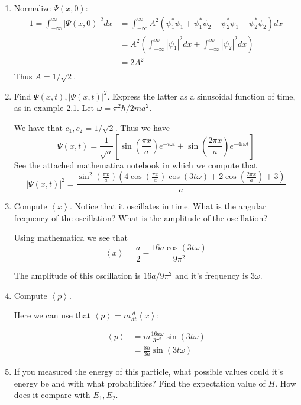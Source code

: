 \documentclass{article}
\newcommand{\bracket}[1]{\left[ #1 \right]}
\newcommand{\paren}[1]{\left( #1 \right)}
\newcommand{\braket}[1]{\left\langle #1 \right\rangle}
\newcommand{\intinf}{\int_{-\infty}^\infty}
\newenvironment{problem}{\begin{enumerate}[label=(\alph*)]}{\end{enumerate}}
\begin{document}
\begin{problem}
  \item Normalize $\Psi(x, 0)$:
    \begin{align*}
      1 = \intinf |\Psi(x, 0)|^2 dx &= \intinf A^2(\psi_1^* \psi_1 + \psi_1^*\psi_2 + \psi_2^* \psi_1 + \psi_2^* \psi_2)dx \\
                                    &= A^2 \paren{\intinf |\psi_1|^2 dx + \intinf |\psi_2|^2 dx} \\
                                    &= 2A^2 \\
    \end{align*}
    Thus $A = 1/\sqrt{2}$.
  \item Find $\Psi(x,t), |\Psi(x,t)|^2$. Express the latter as a sinusoidal function of time, as in example 2.1. Let $\omega = \pi^2\hbar / 2ma^2$.
      
    We have that $c_1, c_2 = 1/\sqrt{2}$. Thus we have
    $$\Psi(x, t) = \frac{1}{\sqrt{a}}\bracket{\sin\paren{\frac{\pi x}{a}}e^{-i\omega t} + \sin\paren{\frac{2 \pi x}{a}}e^{-4i\omega t}}$$
    See the attached mathematica notebook in which we compute that
    $$|\Psi(x, t)|^2 = \frac{\sin ^2\left(\frac{\pi  x}{a}\right) \left(4 \cos \left(\frac{\pi  x}{a}\right) \cos (3 t \omega)+2 \cos \left(\frac{2 \pi  x}{a}\right)+3\right)}{a}$$

  \item Compute $\braket{x}$. Notice that it oscillates in time. What is the angular frequency of the oscillation? What is the amplitude of the oscillation?
    
    Using mathematica we see that
    $$ \braket{x} = \frac{a}{2}-\frac{16 a \cos (3 t\omega)}{9 \pi ^2}$$
    
    The amplitude of this oscillation is $16a/9\pi^2$ and it's frequency is $3\omega$.

  \item Compute $\braket{p}$.

    Here we can use that $\braket{p} = m \frac{d}{dt}\braket{x}$:

    \begin{align*}
      \braket{p} &= m \frac{16a\omega}{3\pi^2} \sin(3t\omega) \\
                 &= \frac{8\hbar}{3a} \sin(3t\omega)
    \end{align*}

  \item If you measured the energy of this particle, what possible values could it's energy be and with what probabilities? Find the expectation value of $H$. How does it compare with $E_1, E_2$.


\end{problem}
\end{document}
